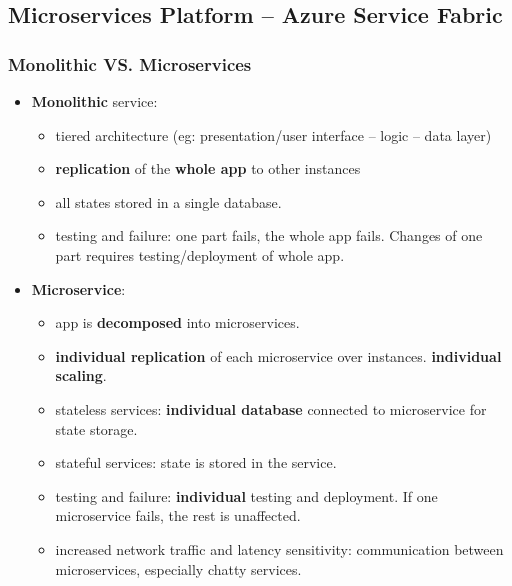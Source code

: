 \subsection{Microservices Platform -- Azure Service Fabric}

\subsubsection{Monolithic VS. Microservices}
\begin{itemize}
	\item \textbf{Monolithic} service:
	\begin{itemize}
		\item tiered architecture (eg: presentation/user interface -- logic -- data layer)
		\item \textbf{replication} of the \textbf{whole app} to other instances
		\item all states stored in a single database.
		\item testing and failure: one part fails, the whole app fails. Changes of one part requires testing/deployment of whole app.
	\end{itemize}
	\item \textbf{Microservice}: 
	\begin{itemize}
		\item app is \textbf{decomposed} into microservices. 
		\item \textbf{individual replication} of each microservice over instances. \textbf{individual scaling}. 
		\item stateless services: \textbf{individual database} connected to microservice for state storage.
		\item stateful services: state is stored in the service. 
		\item testing and failure: \textbf{individual} testing and deployment. If one microservice fails, the rest is unaffected.
		\item increased network traffic and latency sensitivity: communication between microservices, especially chatty services.
	\end{itemize}
\end{itemize}

